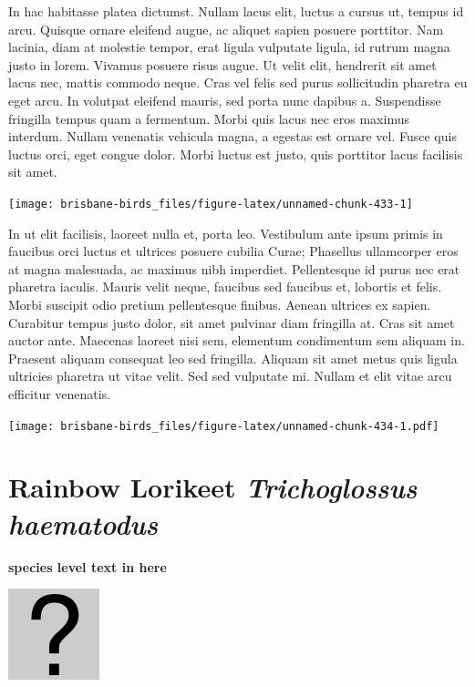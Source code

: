 \documentclass[]{book}
\let\origfigure\figure
\let\endorigfigure\endfigure
\renewenvironment{figure}[1][2] {
  \expandafter\origfigure\expandafter[H]
} {
  \endorigfigure
}
\begin{document}
In hac habitasse platea dictumst. Nullam lacus elit, luctus a cursus ut,
tempus id arcu. Quisque ornare eleifend augue, ac aliquet sapien posuere
porttitor. Nam lacinia, diam at molestie tempor, erat ligula vulputate
ligula, id rutrum magna justo in lorem. Vivamus posuere risus augue. Ut
velit elit, hendrerit sit amet lacus nec, mattis commodo neque. Cras vel
felis sed purus sollicitudin pharetra eu eget arcu. In volutpat eleifend
mauris, sed porta nunc dapibus a. Suspendisse fringilla tempus quam a
fermentum. Morbi quis lacus nec eros maximus interdum. Nullam venenatis
vehicula magna, a egestas est ornare vel. Fusce quis luctus orci, eget
congue dolor. Morbi luctus est justo, quis porttitor lacus facilisis sit
amet.

\begin{figure}
\texttt{[image: brisbane-birds\_files/figure-latex/unnamed-chunk-433-1]} \caption{insert figure caption}\label{fig:unnamed-chunk-433}
\end{figure}

In ut elit facilisis, laoreet nulla et, porta leo. Vestibulum ante ipsum
primis in faucibus orci luctus et ultrices posuere cubilia Curae;
Phasellus ullamcorper eros at magna malesuada, ac maximus nibh
imperdiet. Pellentesque id purus nec erat pharetra iaculis. Mauris velit
neque, faucibus sed faucibus et, lobortis et felis. Morbi suscipit odio
pretium pellentesque finibus. Aenean ultrices ex sapien. Curabitur
tempus justo dolor, sit amet pulvinar diam fringilla at. Cras sit amet
auctor ante. Maecenas laoreet nisi sem, elementum condimentum sem
aliquam in. Praesent aliquam consequat leo sed fringilla. Aliquam sit
amet metus quis ligula ultricies pharetra ut vitae velit. Sed sed
vulputate mi. Nullam et elit vitae arcu efficitur venenatis.

\begin{figure}
\centering
\texttt{[image: brisbane-birds\_files/figure-latex/unnamed-chunk-434-1.pdf]}
\caption{\label{fig:unnamed-chunk-434}insert figure caption}
\end{figure}

\section{\texorpdfstring{Rainbow Lorikeet \emph{Trichoglossus
haematodus}}{Rainbow Lorikeet Trichoglossus haematodus}}\label{rainbow-lorikeet-trichoglossus-haematodus}

\textbf{species level text in here}

\begin{figure}
\centering
\includegraphics{assets/missing.png}
\caption{No image for species}
\end{figure}
\end{document}
